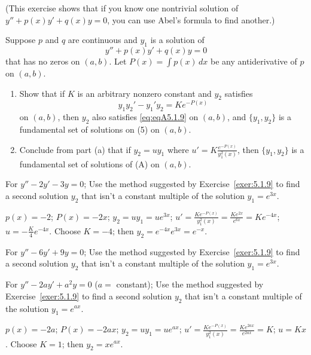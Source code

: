 \documentclass{ximera}
\begin{document}
\begin{problem}\label{exer:5.1.9}  %
(This exercise shows that if you know one
nontrivial solution of $y''+p(x)y'+q(x)y=0$, you can use Abel's
formula to find another.)

Suppose $p$ and $q$ are continuous and $y_1$ is a solution
of
\begin{equation}\label{eq:eqA5.1.9}
y''+p(x)y'+q(x)y=0
\end{equation}
that has no zeros  on  $(a,b)$.
Let $P(x)=\int p(x)\,dx$ be any
antiderivative of $p$ on  $(a,b)$.
\begin{enumerate}
\item %
Show that if $K$ is an arbitrary nonzero constant and
$y_2$  satisfies
$$
y_1y_2'-y_1'y_2=Ke^{-P(x)}
$$
on $(a,b)$, then $y_2$ also satisfies \ref{eq:eqA5.1.9}
on $(a,b)$, and $\{y_1,y_2\}$ is a fundamental set of solutions on
(5) on $(a,b)$.

\item %
Conclude from part (a) that if $y_2=uy_1$ where
$u'=K\frac{e^{-P(x)}}{y_1^2(x)}$, then  $\{y_1,y_2\}$
is a fundamental set of solutions of (A)
on  $(a,b)$.
\end{enumerate}
\end{problem}

\begin{problem}\label{exer:5.1.10}
For $y''-2y'-3y=0$; Use the
method suggested by Exercise~\ref{exer:5.1.9} to find a second solution
$y_2$  that isn't  a constant multiple of the  solution $y_1=e^{3x}$.

\begin{solution}
    $p(x)=-2$;\;
$P(x)=-2x$;\;
$y_2=uy_1=ue^{3x}$;\;
$u'=\frac{Ke^{-P(x)}}{ y_1^2(x)}=\frac{Ke^{2x}}{
e^{6x}}=Ke^{-4x}$;\;
$u=-\frac{K}{4}e^{-4x}$.
Choose $K=-4$;  then
$y_2=e^{-4x}e^{3x}=e^{-x}$.
\end{solution}
\end{problem}

\begin{problem}\label{exer:5.1.11}
For $y''-6y'+9y=0$; Use the
method suggested by Exercise~\ref{exer:5.1.9} to find a second solution
$y_2$  that isn't  a constant multiple of the  solution $y_1=e^{3x}$.
\end{problem}

\begin{problem}\label{exer:5.1.12}%
For $y''-2ay'+a^2y=0$\; ($a=$ constant); Use the
method suggested by Exercise~\ref{exer:5.1.9} to find a second solution
$y_2$  that isn't  a constant multiple of the  solution $y_1=e^{ax}$.

\begin{solution}
    $p(x)=-2a$;\;
$P(x)=-2ax$;\;
$y_2=uy_1=ue^{ax}$;\;
$u'=\frac{Ke^{-P(x)}}{ y_1^2(x)}=\frac{Ke^{2ax}}{ e^{2ax}}=K$;\;
$u=Kx$.
Choose $K=1$; then
$y_2=xe^{ax}$.
\end{solution}
\end{problem}
\end{document}
